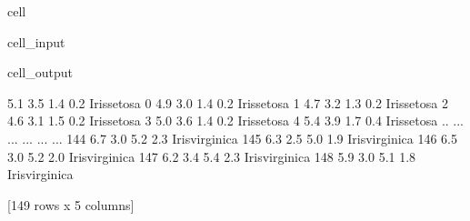 \documentclass[letterpaper,10pt,english]{jupyterBook}
\begin{document}
\begin{sphinxuseclass}{cell}\begin{sphinxVerbatimInput}

\begin{sphinxuseclass}{cell_input}
\begin{sphinxVerbatim}[commandchars=\\\{\}]
   

  
   
 
\end{sphinxVerbatim}

\end{sphinxuseclass}\end{sphinxVerbatimInput}
\begin{sphinxVerbatimOutput}

\begin{sphinxuseclass}{cell_output}
\begin{sphinxVerbatim}[commandchars=\\\{\}]
     5.1  3.5  1.4  0.2     Iris\PYGZhy{}setosa
0    4.9  3.0  1.4  0.2     Iris\PYGZhy{}setosa
1    4.7  3.2  1.3  0.2     Iris\PYGZhy{}setosa
2    4.6  3.1  1.5  0.2     Iris\PYGZhy{}setosa
3    5.0  3.6  1.4  0.2     Iris\PYGZhy{}setosa
4    5.4  3.9  1.7  0.4     Iris\PYGZhy{}setosa
..   ...  ...  ...  ...             ...
144  6.7  3.0  5.2  2.3  Iris\PYGZhy{}virginica
145  6.3  2.5  5.0  1.9  Iris\PYGZhy{}virginica
146  6.5  3.0  5.2  2.0  Iris\PYGZhy{}virginica
147  6.2  3.4  5.4  2.3  Iris\PYGZhy{}virginica
148  5.9  3.0  5.1  1.8  Iris\PYGZhy{}virginica

[149 rows x 5 columns]
\end{sphinxVerbatim}

\end{sphinxuseclass}\end{sphinxVerbatimOutput}

\end{sphinxuseclass}
\sphinxAtStartPar
\end{document}
